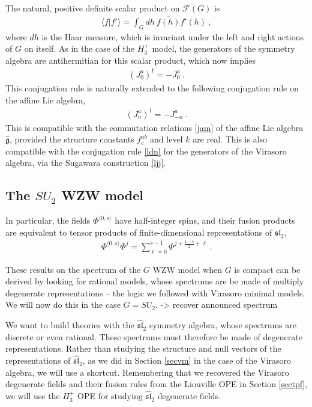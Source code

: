 \documentclass[12pt, a4paper, notitlepage, twoside]{report}
\numberwithin{equation}{section}
\theoremstyle{break}
\begin{document}
The natural, positive definite scalar product on $\mathcal{F}(G)$ is 
\begin{align}
 \langle f|f'\rangle = \int_G dh\ \overline{f(h)} f'(h)\ ,
\label{gbg}
\end{align}
where $dh$ is the Haar measure, which is invariant under the left and right actions of $G$ on itself.
As in the case of the $H_3^+$ model, the generators of the symmetry algebra are antihermitian for this scalar product, which now implies
\begin{align}
 (J^a_0)^\dagger = -J^a_0\  . 
\label{jzdj}
\end{align}
This conjugation rule is naturally extended to the following conjugation rule on the affine Lie algebra,
\begin{align}
 \boxed{(J^a_n)^\dagger = -J^a_{-n}}\ .
\end{align}
This is compatible with the commutation relations \eqref{jam} of the affine Lie algebra $\hat{\mathfrak{g}}$, provided the structure constants $f^{ab}_c$ and level $k$ are real.
This is also compatible with the conjugation rule \eqref{ldn} for the generators of the Virasoro algebra, via the Sugawara construction \eqref{ljj}.


\subsection{The \texorpdfstring{$SU_2$}{SU(2)} WZW model \label{secsu}}

In particular, the fields $\Phi^{\langle 0, s\rangle}$ have half-integer spins, and their fusion products are equivalent to tensor products of finite-dimensional representations of $\mathfrak{sl}_2$,
\begin{align}
 \Phi^{\langle 0, s\rangle}\Phi^j  = \sum_{\ell=0}^{s-1} \Phi^{j+\frac{1-s}{2}+\ell}\ .
\end{align}

These results on the spectrum of the $G$ WZW model when $G$ is compact can be derived by looking for rational models, whose spectrums are be made of multiply degenerate representations -- the logic we followed with Virasoro minimal models.
We will now do this in the case $G=SU_2$.   -> recover announced spectrum

We want to build theories with the $\widehat{\mathfrak{sl}}_2$ symmetry algebra, whose spectrums are discrete or even rational.
These spectrums must therefore be made of degenerate representations.
Rather than studying the structure and null vectors of the representations of $\widehat{\mathfrak{sl}}_2$, as we did in Section \ref{secvm} in the case of the Virasoro algebra, 
we will use a shortcut.
Remembering that we recovered
the Virasoro degenerate fields and their fusion rules from the Liouville OPE in Section \ref{sectpf},
we will use the $H_3^+$ OPE for studying $\widehat{\mathfrak{sl}}_2$ degenerate fields. 
\end{document}
